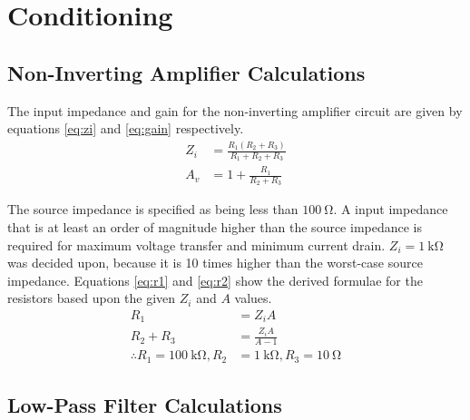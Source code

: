 \section{Conditioning}
\label{ap:conditioning}

\subsection{Non-Inverting Amplifier Calculations}
\label{ap:amplifier}

The input impedance and gain for the non-inverting amplifier circuit are given by equations \ref{eq:zi} and \ref{eq:gain} respectively.
\begin{align}
	Z_i &= \frac{R_1 (R_2 + R_3)}{R_1 + R_2 + R_3} \label{eq:zi} \\
	A_v &= 1 + \frac{R_1}{R_2 + R_3}\label{eq:gain}
\end{align}

The source impedance is specified as being less than $\SI{100}{\ohm}$.
A input impedance that is at least an order of magnitude higher than the source impedance is required for maximum voltage transfer and minimum current drain.
$Z_i = \SI{1}{\kilo\ohm}$ was decided upon, because it is 10 times higher than the worst-case source impedance.
Equations \ref{eq:r1} and \ref{eq:r2} show the derived formulae for the resistors based upon the given $Z_i$ and $A$ values.
\begin{align}
	R_1 &= Z_i A \label{eq:r1} \\
	R_2 + R_3 &= \frac{Z_i A}{A - 1} \label{eq:r2} \\[1em]
	\therefore R_1 = \SI{100}{\kilo\ohm}, R_2 &= \SI{1}{\kilo\ohm}, R_3 = \SI{10}{\ohm} \nonumber
\end{align}


\subsection{Low-Pass Filter Calculations}
\label{ap:filter}

